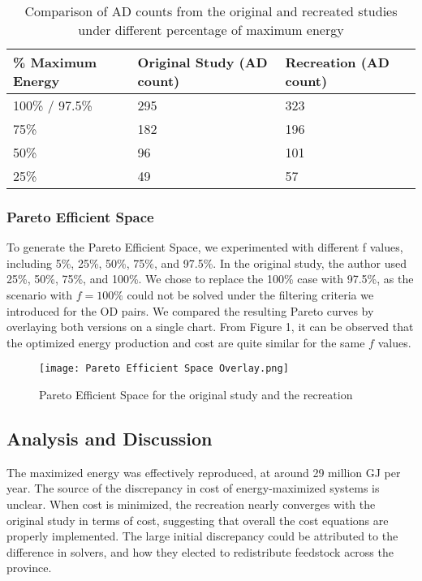 \documentclass[12pt]{article}
\begin{document}
\begin{table}[H]
  \centering
  \begin{tabular}{|p{4cm} | p{5cm} | p{5cm}|}
  \hline
  \rowcolor{gray!30}
  \% Maximum Energy & Original Study (AD count) & Recreation (AD count) \\ \hline
  100\% / 97.5\% & 295 & 323 \\ \hline
  75\% & 182 & 196 \\ \hline
  50\% & 96 & 101 \\ \hline
  25\% & 49 & 57 \\ \hline
  \end{tabular}
  \caption{Comparison of AD counts from the original and recreated studies under different percentage of maximum energy}
  \label{tab:adplants_energy}
\end{table}

\subsubsection{Pareto Efficient Space}

To generate the Pareto Efficient Space, we experimented with different f values, including 5\%, 25\%, 50\%, 75\%, and 97.5\%. In the original study, the author used 25\%, 50\%, 75\%, and 100\%. We chose to replace the 100\% case with 97.5\%, as the scenario with $f = 100\%$ could not be solved under the filtering criteria we introduced for the OD pairs. We compared the resulting Pareto curves by overlaying both versions on a single chart. From Figure 1, it can be observed that the optimized energy production and cost are quite similar for the same $f$ values.

\begin{figure}[H]
  \centering
  \texttt{[image: Pareto Efficient Space Overlay.png]}
  \caption{Pareto Efficient Space for the original study and the recreation}
  \label{fig:pareto_curve}
\end{figure}

\subsection{Analysis and Discussion}
The maximized energy was effectively reproduced, at around 29 million GJ per year. The source of the discrepancy in cost of energy-maximized systems is unclear. When cost is minimized, the recreation nearly converges with the original study in terms of cost, suggesting that overall the cost equations are properly implemented. The large initial discrepancy could be attributed to the difference in solvers, and how they elected to redistribute feedstock across the province. 
\end{document}
